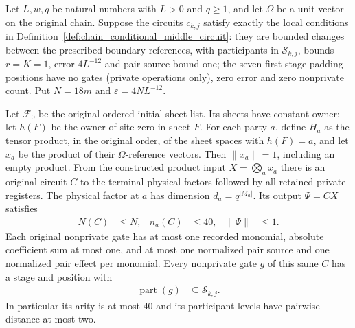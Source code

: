 \begin{lemma}
    \label{thm:chain_conditional_preparation}
    \leanok
    Let $L,w,q$ be natural numbers with $L>0$ and $q\ge1$, and let
    $\Omega$ be a unit vector on the original chain. Suppose the circuits $c_{k,j}$ satisfy exactly
    the local conditions in Definition~\ref{def:chain_conditional_middle_circuit}:
    they are bounded changes between the prescribed boundary references,
    with participants in $\mathcal S_{k,j}$, bounds $r=K=1$, error
    $4L^{-12}$ and pair-source bound one; the seven first-stage padding
    positions have no gates (private operations only), zero error and
    zero nonprivate count.
    Put $N=18m$ and $\varepsilon=4NL^{-12}$.

    Let $\mathcal F_0$ be the original ordered initial sheet list.
    Its sheets have constant owner; let $h(F)$ be the owner of site zero
    in sheet $F$. For each party $a$, define $H_a$ as the tensor product,
    in the original order, of the sheet spaces with $h(F)=a$, and let
    $x_a$ be the product of their $\Omega$-reference vectors. Then
    $\|x_a\|=1$, including an empty product. From the constructed product
    input $X=\bigotimes_a x_a$ there is an original circuit $C$ to the
    terminal physical factors followed by all retained private
    registers. The physical factor at $a$ has dimension $d_a=q^{|M_a|}$.
    Its output $\Psi=CX$ satisfies
    \begin{align}
        N(C) & \le N, & n_a(C) & \le40, & \|\Psi\| & \le1.
        \label{eq:chain_preparation_counts}
    \end{align}
    Each original nonprivate gate has at most one recorded monomial, absolute
    coefficient sum at most one, and at most one normalized pair source
    and one normalized pair effect per monomial. Every nonprivate gate
    $g$ of this same $C$ has a stage and position with
    \begin{align}
        \operatorname{part}(g) & \subseteq\mathcal S_{k,j}.
        \label{eq:chain_preparation_support}
    \end{align}
    In particular its arity is at most $40$ and its participant levels
    have pairwise distance at most two.


\end{lemma}
